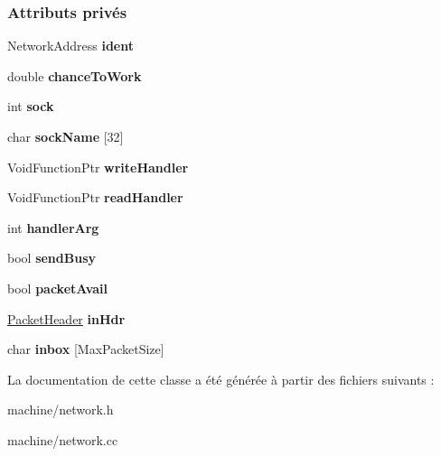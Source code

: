 \subsubsection*{Attributs privés}
\begin{DoxyCompactItemize}
\item 
\hypertarget{class_network_a3ae032efa004363c75e271f6c2511120}{}\label{class_network_a3ae032efa004363c75e271f6c2511120} 
Network\+Address {\bfseries ident}
\item 
\hypertarget{class_network_ad7c13d9b762a6f5507e606c3b155fda0}{}\label{class_network_ad7c13d9b762a6f5507e606c3b155fda0} 
double {\bfseries chance\+To\+Work}
\item 
\hypertarget{class_network_ad3175dd7f73b9fc80f6951e9bdbb4003}{}\label{class_network_ad3175dd7f73b9fc80f6951e9bdbb4003} 
int {\bfseries sock}
\item 
\hypertarget{class_network_ad944b6abcb052bba08ac4b96ee948087}{}\label{class_network_ad944b6abcb052bba08ac4b96ee948087} 
char {\bfseries sock\+Name} \mbox{[}32\mbox{]}
\item 
\hypertarget{class_network_ab02494839dcc7a83a00b8d8baf444c63}{}\label{class_network_ab02494839dcc7a83a00b8d8baf444c63} 
Void\+Function\+Ptr {\bfseries write\+Handler}
\item 
\hypertarget{class_network_a1756ec12581072e48a475d9ba9b9c533}{}\label{class_network_a1756ec12581072e48a475d9ba9b9c533} 
Void\+Function\+Ptr {\bfseries read\+Handler}
\item 
\hypertarget{class_network_acdb37b096697191ba5959e2baf689bcc}{}\label{class_network_acdb37b096697191ba5959e2baf689bcc} 
int {\bfseries handler\+Arg}
\item 
\hypertarget{class_network_a1cd885e10158a863ee80b950c576c4a4}{}\label{class_network_a1cd885e10158a863ee80b950c576c4a4} 
bool {\bfseries send\+Busy}
\item 
\hypertarget{class_network_aa5b78b0da20c8fd26d812c7bfd191a43}{}\label{class_network_aa5b78b0da20c8fd26d812c7bfd191a43} 
bool {\bfseries packet\+Avail}
\item 
\hypertarget{class_network_aaefabeae4dff580c7a9bfbb4c943eb6b}{}\label{class_network_aaefabeae4dff580c7a9bfbb4c943eb6b} 
\hyperlink{class_packet_header}{Packet\+Header} {\bfseries in\+Hdr}
\item 
\hypertarget{class_network_ae63ae6d608c1c534c546376937291db4}{}\label{class_network_ae63ae6d608c1c534c546376937291db4} 
char {\bfseries inbox} \mbox{[}Max\+Packet\+Size\mbox{]}
\end{DoxyCompactItemize}


La documentation de cette classe a été générée à partir des fichiers suivants \+:\begin{DoxyCompactItemize}
\item 
machine/network.\+h\item 
machine/network.\+cc\end{DoxyCompactItemize}
